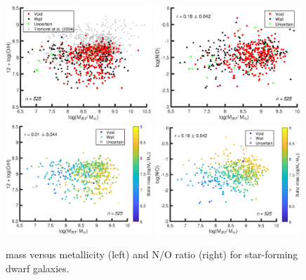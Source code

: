 \begin{figure}
    \centering
    \includegraphics[width=0.49\textwidth]{Images/Paper3/HI_OH_1sig_I06relations_dwarf+T04_SF_t3_dust}
    \includegraphics[width=0.49\textwidth]{Images/Paper3/HI_NO_1sig_I06relations_dwarf_SF_t3_dust}
    \includegraphics[width=0.49\textwidth]{Images/Paper3/HI_OH_M_1sig_I06relations_dwarf_SF_t3_dust}
    \includegraphics[width=0.49\textwidth]{Images/Paper3/HI_NO_M_1sig_I06relations_dwarf_SF_t3_dust}
    \caption[ mass versus O/H and N/O]{ mass versus 
    metallicity (left) and N/O ratio (right) for star-forming dwarf galaxies.  
}
\end{figure}
